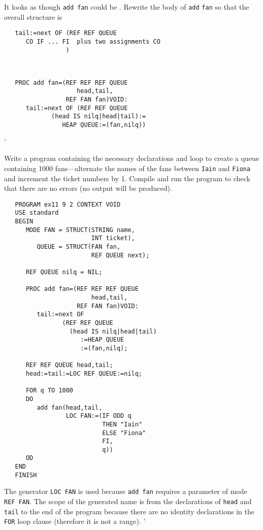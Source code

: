 \begin{exercise}
\item It looks as though \verb|add fan| could be
. Rewrite the body of \verb|add|
\verb|fan| so that the overall structure is
\begin{verbatim}
   tail:=next OF (REF REF QUEUE
      CO IF ... FI  plus two assignments CO
                 )
\end{verbatim}
\indent \ans \ %
\begin{verbatim}
   PROC add fan=(REF REF REF QUEUE
                    head,tail,
                 REF FAN fan)VOID:
      tail:=next OF (REF REF QUEUE
             (head IS nilq|head|tail):=
                HEAP QUEUE:=(fan,nilq))
\end{verbatim}
'
\item Write a program containing the necessary declarations and loop to
create a queue containing 1000 fans---alternate the names of the fans
between \verb|Iain| and \verb|Fiona| and increment the ticket
numbers by 1. Compile and run the program to check that there are no
errors (no output will be produced). \ans \ %
\begin{verbatim}
   PROGRAM ex11 9 2 CONTEXT VOID
   USE standard
   BEGIN
      MODE FAN = STRUCT(STRING name,
                        INT ticket),
         QUEUE = STRUCT(FAN fan,
                        REF QUEUE next);

      REF QUEUE nilq = NIL;

      PROC add fan=(REF REF REF QUEUE
                        head,tail,
                    REF FAN fan)VOID:
         tail:=next OF
                (REF REF QUEUE
                  (head IS nilq|head|tail)
                     :=HEAP QUEUE
                     :=(fan,nilq);

      REF REF QUEUE head,tail;
      head:=tail:=LOC REF QUEUE:=nilq;

      FOR q TO 1000
      DO
         add fan(head,tail,
                 LOC FAN:=(IF ODD q
                           THEN "Iain"
                           ELSE "Fiona"
                           FI,
                           q))
      OD
   END
   FINISH
\end{verbatim}
\noindent The generator \verb|LOC FAN| is used because \verb|add fan|
requires a parameter of mode \verb|REF FAN|. The scope of the
generated name is from the declarations of \verb|head| and
\verb|tail| to the end of the program because there are no identity
declarations in the \verb|FOR| loop clause (therefore it is not a
range).
'
\end{exercise}

